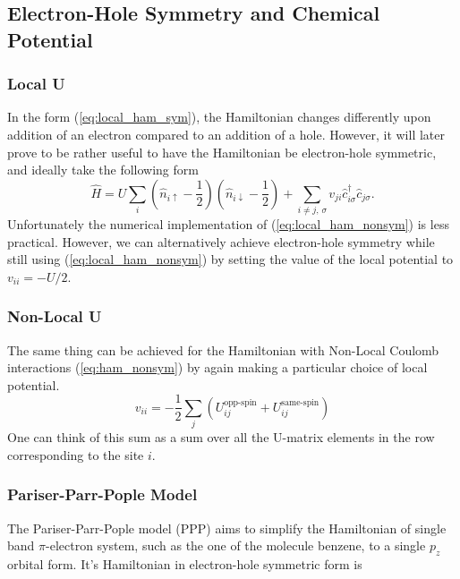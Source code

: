 \subsection{Electron-Hole Symmetry and Chemical Potential} \label{sec:electron_hole_symmetry}
\subsubsection{Local U}
In the form (\ref{eq:local_ham_sym}), the Hamiltonian changes differently upon addition of an electron compared to an addition of a hole. However, it will later prove to be rather useful to have the Hamiltonian be electron-hole symmetric, and ideally take the following form
\begin{equation}
    \hat{H} = U \sum_i \left(\hat{n}_{i\uparrow}-\frac{1}{2}\right)\left(\hat{n}_{i\downarrow}-\frac{1}{2}\right)+\sum_{i\neq j,\,\sigma} v_{j i} \hat{c}_{i \sigma}^{\dagger} \hat{c}_{j \sigma}\label{eq:local_ham_sym}.
\end{equation}
Unfortunately the numerical implementation of (\ref{eq:local_ham_nonsym}) is less practical. However, we can alternatively achieve electron-hole symmetry while still using (\ref{eq:local_ham_nonsym}) by setting the value of the local potential to $v_{ii} = -U / 2$.
\medskip

\subsubsection{Non-Local U}
The same thing can be achieved for the Hamiltonian with Non-Local Coulomb interactions (\ref{eq:ham_nonsym}) by again making a particular choice of local potential. 
\begin{equation}
    v_{ii} = - \frac{1}{2}\sum_{j}\left( U_{ij}^{\text{opp-spin}} + U_{ij}^{\text{same-spin}}\right)
\end{equation}
One can think of this sum as a sum over all the U-matrix elements in the row corresponding to the site $i$. 


\subsubsection{Pariser-Parr-Pople Model}\label{subsec:ppp}

The Pariser-Parr-Pople model (PPP) aims to simplify the Hamiltonian of single band $\pi$-electron system, such as the one of the molecule benzene, to a single $p_z$ orbital form. It's Hamiltonian in electron-hole symmetric form is

